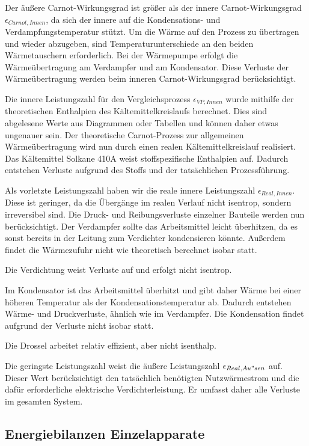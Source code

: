 Der äußere Carnot-Wirkungsgrad ist größer als der innere Carnot-Wirkungsgrad $\epsilon_{Carnot,Innen}$, da sich der innere auf die Kondensations- und Verdampfungstemperatur stützt. 
Um die Wärme auf den Prozess zu übertragen und wieder abzugeben, sind Temperaturunterschiede an den beiden Wärmetauschern erforderlich. 
Bei der Wärmepumpe erfolgt die Wärmeübertragung am Verdampfer und am Kondensator. 
Diese Verluste der Wärmeübertragung werden beim inneren Carnot-Wirkungsgrad berücksichtigt.

Die innere Leistungszahl für den Vergleichsprozess $\epsilon_{VP,Innen}$ wurde mithilfe der theoretischen Enthalpien des Kältemittelkreislaufs berechnet.
Dies sind abgelesene Werte aus Diagrammen oder Tabellen und können daher etwas ungenauer sein. 
Der theoretische Carnot-Prozess zur allgemeinen Wärmeübertragung wird nun durch einen realen Kältemittelkreislauf realisiert. 
Das Kältemittel Solkane 410A weist stoffspezifische Enthalpien auf. 
Dadurch entstehen Verluste aufgrund des Stoffs und der tatsächlichen Prozessführung.

Als vorletzte Leistungszahl haben wir die reale innere Leistungszahl $\epsilon_{Real,Innen}$.
Diese ist geringer, da die Übergänge im realen Verlauf nicht isentrop, sondern irreversibel sind. 
Die Druck- und Reibungsverluste einzelner Bauteile werden nun berücksichtigt. 
Der Verdampfer sollte das Arbeitsmittel leicht überhitzen, da es sonst bereits in der Leitung zum Verdichter kondensieren könnte. 
Außerdem findet die Wärmezufuhr nicht wie theoretisch berechnet isobar statt.

Die Verdichtung weist Verluste auf und erfolgt nicht isentrop.

Im Kondensator ist das Arbeitsmittel überhitzt und gibt daher Wärme bei einer höheren Temperatur als der Kondensationstemperatur ab. 
Dadurch entstehen Wärme- und Druckverluste, ähnlich wie im Verdampfer. 
Die Kondensation findet aufgrund der Verluste nicht isobar statt.

Die Drossel arbeitet relativ effizient, aber nicht isenthalp.

Die geringste Leistungszahl weist die äußere Leistungszahl $\epsilon_{Real,Au"sen}$ auf. 
Dieser Wert berücksichtigt den tatsächlich benötigten Nutzwärmestrom und die dafür erforderliche elektrische Verdichterleistung. 
Er umfasst daher alle Verluste im gesamten System.


\subsection{Energiebilanzen Einzelapparate}

